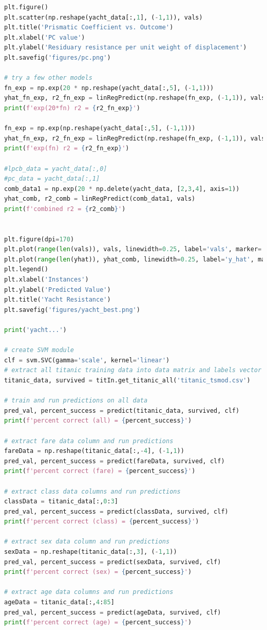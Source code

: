 \documentclass[11pt,a4paper]{article}
\begin{document}
\begin{lstlisting}[language=Python]
plt.figure()
plt.scatter(np.reshape(yacht_data[:,1], (-1,1)), vals)
plt.title('Prismatic Coefficient vs. Outcome')
plt.xlabel('PC value')
plt.ylabel('Residuary resistance per unit weight of displacement')
plt.savefig('figures/pc.png')

# try a few other models
fn_exp = np.exp(20 * np.reshape(yacht_data[:,5], (-1,1)))
yhat_fn_exp, r2_fn_exp = linRegPredict(np.reshape(fn_exp, (-1,1)), vals)
print(f'exp(20*fn) r2 = {r2_fn_exp}')

fn_exp = np.exp(np.reshape(yacht_data[:,5], (-1,1)))
yhat_fn_exp, r2_fn_exp = linRegPredict(np.reshape(fn_exp, (-1,1)), vals)
print(f'exp(fn) r2 = {r2_fn_exp}')

#lpcb_data = yacht_data[:,0]
#pc_data = yacht_data[:,1]
comb_data1 = np.exp(20 * np.delete(yacht_data, [2,3,4], axis=1))
yhat_comb, r2_comb = linRegPredict(comb_data1, vals)
print(f'combined r2 = {r2_comb}')


plt.figure(dpi=170)
plt.plot(range(len(vals)), vals, linewidth=0.25, label='vals', marker='.')
plt.plot(range(len(yhat)), yhat_comb, linewidth=0.25, label='y_hat', marker='.')
plt.legend()
plt.xlabel('Instances')
plt.ylabel('Predicted Value')
plt.title('Yacht Resistance')
plt.savefig('figures/yacht_best.png')

print('yacht...')

# create SVM module
clf = svm.SVC(gamma='scale', kernel='linear')
# extract all titanic training data into data matrix and labels vector
titanic_data, survived = titIn.get_titanic_all('titanic_tsmod.csv')

# train and run predictions on all data
pred_val, percent_success = predict(titanic_data, survived, clf)
print(f'percent correct (all) = {percent_success}')

# extract fare data column and run predictions
fareData = np.reshape(titanic_data[:,-4], (-1,1))
pred_val, percent_success = predict(fareData, survived, clf)
print(f'percent correct (fare) = {percent_success}')

# extract class data columns and run predictions
classData = titanic_data[:,0:3]
pred_val, percent_success = predict(classData, survived, clf)
print(f'percent correct (class) = {percent_success}')

# extract sex data column and run predictions
sexData = np.reshape(titanic_data[:,3], (-1,1))
pred_val, percent_success = predict(sexData, survived, clf)
print(f'percent correct (sex) = {percent_success}')

# extract age data columns and run predictions
ageData = titanic_data[:,4:85]
pred_val, percent_success = predict(ageData, survived, clf)
print(f'percent correct (age) = {percent_success}')


\end{lstlisting}
\end{document}
